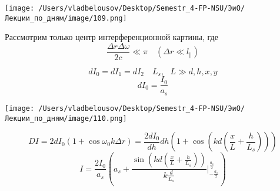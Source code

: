 \documentclass[12pt, a4paper]{report}
\begin{document}
\begin{center}
    \texttt{[image: /Users/vladbelousov/Desktop/Semestr\_4-FP-NSU/ЭиО/Лекции\_по\_дням/image/109.png]}
\end{center}  

Рассмотрим только центр интерференционной картины, где 
\[  \displaystyle  \frac{\Delta r \Delta \omega }{2 c } \ll \pi \quad  ( \Delta r \ll l_{ \parallel} ) \] 

\[ d I_0 = d I_1 = d I_2 \quad  L_s , \text{ }  L \gg d, h, x ,y \]
\[ d I_0 = \frac{I_0}{a_s}  \]  

\begin{center}
    \texttt{[image: /Users/vladbelousov/Desktop/Semestr\_4-FP-NSU/ЭиО/Лекции\_по\_дням/image/110.png]}
\end{center} 

\[ D I = 2 d I_0 (1 + \cos \omega_0 k \Delta r ) = \frac{2 d I_0 }{dh      } dh \left( 1 + \cos \left( k d \left( \frac{x}{L }  + \frac{h}{L_s}  \right) \right) \right)   \] 
\[ I = \frac{2 I_0 }{a_s } \left( a_s +\frac{\sin \left( kd \left( \frac{x}{L } + \frac{h}{L_s }  \right) \right)}{k \frac{d}{L_s} }\bigg |_{-\frac{a_s}{2} }^{\frac{a_s}{2} }    \right)   \] 

\ifdefined\mainfile
\else
    
\end{document}
